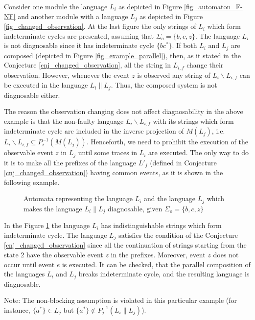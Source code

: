 \documentclass[a4paper, 10pt, conference]{ieeeconf} \IEEEoverridecommandlockouts
\begin{document}
\begin{example} Consider one module the language $L_i$ as depicted in
Figure \ref{fig_automaton_F-NF} and another module with a language $L_j$ as
depicted in Figure \ref{fig_changed_observation}. At the last figure the
only strings of $L_i$ which form indeterminate cycles are presented, assuming that 
$\Sigma_o = \{b, c, z\}$. The language $L_i$ is not diagnosable since it has
indeterminate cycle $\{bc^*\}$. If both $L_i$ and $L_j$ are composed
(depicted in Figure \ref{fig_example_parallel}), then, as it
stated in the Conjecture \ref{cnj_changed_observation}, all the string in
$L_{i,f}$ change their observation.
However, whenever the event $z$ is observed any string of $L_i\backslash
L_{i,f}$ can be executed in the language $L_i \parallel L_j$.
Thus, the composed system is not diagnosable either.
\end{example}

The reason the observation changing does not affect diagnosability in the
above example is that the non-faulty language $L_i\backslash L_{i,f}$ with its 
strings which form indeterminate cycle are included in the inverse projection of
$M(L_j)$, i.e.
$
L_i\backslash L_{i,f} \subseteq P_i^{-1}(M(L_j)).
$
Henceforth, we need to prohibit the execution of the observable event $z$
in $L_j$ until some traces in $L_i$ are executed. The only way to do it is to
make all the prefixes of the language $L'_j$ (defined in Conjecture
\ref{cnj_changed_observation}) having common events, as it is shown in the
following example.

\begin{figure}[t]
\centering

\caption{Automata representing the language $L_i$ and the language $L_j$ which
makes the language $L_i \parallel L_j$ diagnosable, given 
$\Sigma_o = \{b, c, z\}$}
\label{fig_changed_observation2}
\end{figure}

\begin{example} In the Figure \ref{fig_changed_observation2} the language $L_i$
has indistinguishable strings which form indeterminate cycle. The language
$L_j$ satisfies the condition of the Conjecture \ref{cnj_changed_observation}
since all the continuation of strings starting from the state $2$ have the
observable event $z$ in the prefixes. Moreover, event $z$ does not occur until 
event $e$ is executed. It can be checked, that the parallel composition of the
languages $L_i$ and $L_j$ breaks indeterminate cycle, and the resulting
language is diagnosable.

Note: The non-blocking assumption is violated in this particular example (for
instance, 
$\{a^*\} \in L_j$ but $\{a^*\} \not \in P^{-1}_j(L_i \parallel L_j)$).
\end{example}
\end{document}
